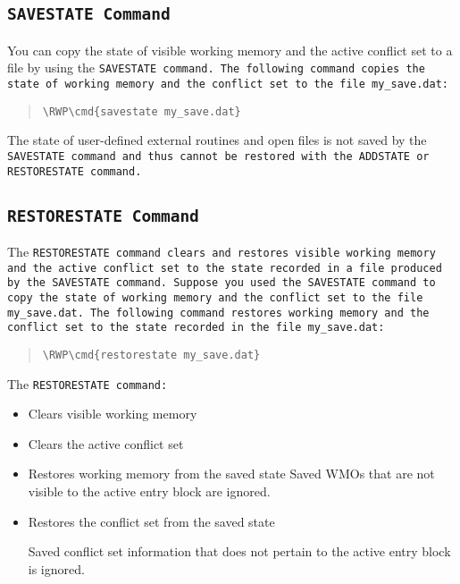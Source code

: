 \subsection{\tt{SAVESTATE} Command}

You can copy the state of visible working memory and the active
conflict set to a file by using the \tt{SAVESTATE} command. The
following command copies the state of working memory and the
conflict set to the file \verb|my_save.dat|:

\begin{quote}
\begin{Verbatim}[commandchars=\\\{\}]
\RWP\cmd{savestate my_save.dat}
\end{Verbatim}
\end{quote}  

\begin{note}
  The state of user-defined external routines and open files is not
  saved by the \tt{SAVESTATE} command and thus cannot be restored with
  the \tt{ADDSTATE} or \tt{RESTORESTATE} command.
\end{note}

\subsection{\tt{RESTORESTATE} Command}

The \tt{RESTORESTATE} command clears and restores visible working
memory and the active conflict set to the state recorded in a
file produced by the \tt{SAVESTATE} command. Suppose you used the
\tt{SAVESTATE} command to copy the state of working memory and the
conflict set to the file \verb|my_save.dat|. The following command
restores working memory and the conflict set to the state
recorded in the file \verb|my_save.dat|:

\begin{quote}
\begin{Verbatim}[commandchars=\\\{\}]
\RWP\cmd{restorestate my_save.dat}
\end{Verbatim}
\end{quote}

The \tt{RESTORESTATE} command:

\begin{itemize}
\item Clears visible working memory
\item Clears the active conflict set
\item Restores working memory from the saved state Saved WMOs that are
  not visible to the active entry block are ignored.
\item Restores the conflict set from the saved state

  Saved conflict set information that does not pertain to the active
  entry block is ignored.
\end{itemize}

